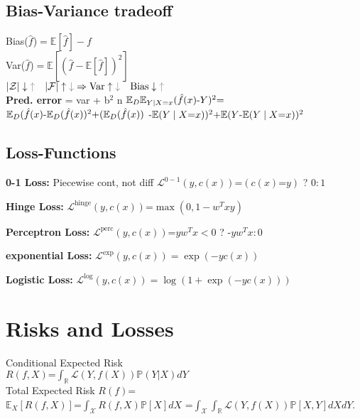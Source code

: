 \subsection*{Bias-Variance tradeoff}
Bias($\hat{f}$)$=\mathbb{E}[\hat{f}]-f$\\
Var($\hat{f}$)$=\mathbb{E}[(\hat{f}-\mathbb{E}[\hat{f}])^2]$\\
$|\mathcal{Z}|\downarrow {\color{gray} \uparrow} \quad|\mathcal{F}|\uparrow {\color{gray} \downarrow}\Rightarrow\mathrm{Var}\uparrow{\color{gray} \downarrow}\quad\mathrm{Bias}\downarrow {\color{gray} \uparrow}$\\

\textbf{Pred. error } = var + b$^2$ \text{+} n
$
		\mathbb E_D\mathbb E_{Y\mid X\text{=}x}(\hat f(x) \text{-} Y)^2 \text{=}$ $
	\mathbb E_D(\hat f(x) \text{-} \mathbb E_D(\hat f(x))^2 
	\text{+} (\mathbb E_D(\hat f(x))$ $ \text{-} \mathbb E(Y\mid X\text{=}x))^2 
	\text{+}  \mathbb E(Y \text{-} \mathbb E(Y\mid X\text{=}x))^2
$

\subsection{Loss-Functions}
\textbf{0-1 Loss: } Piecewise cont, not diff
$\mathcal L^{0-1}\left(y, c(x)\right) \text{=} (c(x)\text{=}y)$ ? $0:1$


\textbf{Hinge Loss: } 
$
\mathcal L^{\text{hinge}}\left(y, c(x)\right) \text{=} \max(0, 1-w^Txy)$ 


\textbf{Perceptron Loss: }
$
\mathcal L^{\text{perc}}\left(y, c(x)\right) \text{=}  yw^Tx< 0$ ? $\text{-}y w^Tx:0$  

\textbf{exponential Loss: }
$
\mathcal L^{\exp}\left(y, c(x)\right) = 
\exp(-yc(x))$

\textbf{Logistic Loss: }
$
\mathcal L^{\log}\left(y, c(x)\right) = \log( 1 + \exp(-yc(x)))$

\section*{Risks and Losses}
Conditional Expected Risk\\
$R(f, X) \text{=} \int_{\mathbb{R}} \mathcal{L}(Y,f(X))\mathbb{P}(Y|X)d Y$\\
Total Expected Risk
$R(f) \text{=}$\\
$\mathbb{E}_{X}[R(f,X)] \text{=}\int_{\mathcal{X}}R(f,X)\mathbb{P}[X]d X $ $\text{=}
\int_{\mathcal{X}}\int_{\mathbb{R}} \mathcal{L}(Y,f(X))\mathbb{P}[X,Y]d Xd Y$.



